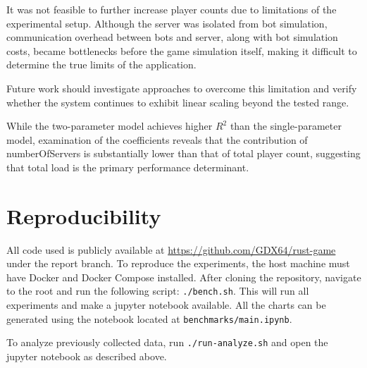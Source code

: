\documentclass[acmsmall]{acmart}
\begin{document}
It was not feasible to further increase player counts due to limitations of the experimental setup. Although the server was isolated from bot simulation, communication overhead between bots and server, along with bot simulation costs, became bottlenecks before the game simulation itself, making it difficult to determine the true limits of the application.

Future work should investigate approaches to overcome this limitation and verify whether the system continues to exhibit linear scaling beyond the tested range.

While the two-parameter model achieves higher $R^2$ than the single-parameter model, examination of the coefficients reveals that the contribution of numberOfServers is substantially lower than that of total player count, suggesting that total load is the primary performance determinant.

\section{Reproducibility}

All code used is publicly available at \url{https://github.com/GDX64/rust-game} under the report branch. To reproduce the experiments, the host machine must have Docker and Docker Compose installed. After cloning the repository, navigate to the root and run the following script: \texttt{./bench.sh}. This will run all experiments and make a jupyter notebook available. All the charts can be generated using the notebook located at \texttt{benchmarks/main.ipynb}.

To analyze previously collected data, run \texttt{./run-analyze.sh} and open the jupyter notebook as described above.
\end{document}
